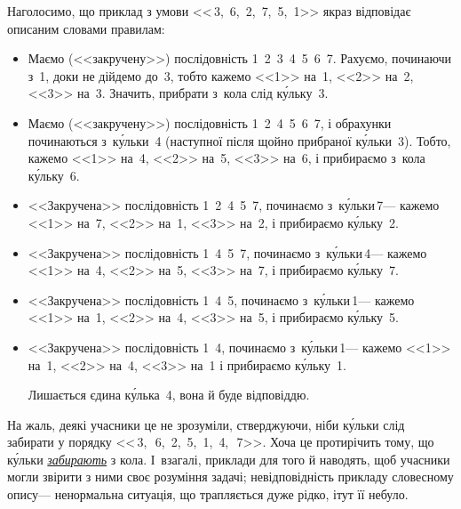 \Tutorial	
Наголосимо, що приклад з умови <<\textnumero$\,$3, \textnumero$\,$6, \textnumero$\,$2, \textnumero$\,$7, \textnumero$\,$5, \textnumero$\,$1>> якраз відповідає описаним словами правилам:
\begin{itemize}
\item
Маємо (<<закручену>>) послідовність 1~2~3~4~5~6~7. Рахуємо, починаючи з \textnumero$\,$1, доки не дійдемо до~3, тобто кажемо 
<<1>> на \textnumero$\,$1, 
<<2>> на \textnumero$\,$2, 
<<3>> на \textnumero$\,$3. Значить, прибрати з~кола слід к\'{у}льку \textnumero$\,$3.
\item
Маємо (<<закручену>>) послідовність 1~2~4~5~6~7, і обрахунки починаються з~к\'{у}льки \textnumero$\,$4 (наступної після щойно прибраної к\'{у}льки \textnumero$\,$3).
Тобто, кажемо 
<<1>> на \textnumero$\,$4, 
<<2>> на \textnumero$\,$5, 
<<3>> на \textnumero$\,$6, і прибираємо з~кола к\'{у}льку \textnumero$\,$6.
\item
<<Закручена>> послідовність 1~2~4~5~7, починаємо з~к\'{у}льки\nolinebreak[3] \textnumero$\,$7\nolinebreak[3] --- кажемо 
<<1>> на \textnumero$\,$7, 
<<2>> на \textnumero$\,$1, 
<<3>> на \textnumero$\,$2, і прибираємо к\'{у}льку \textnumero$\,$2.
\item
<<Закручена>> послідовність 1~4~5~7, починаємо з~к\'{у}льки\nolinebreak[3] \textnumero$\,$4\nolinebreak[3] --- кажемо 
<<1>> на \textnumero$\,$4, 
<<2>> на \textnumero$\,$5, 
<<3>> на \textnumero$\,$7, і прибираємо к\'{у}льку \textnumero$\,$7.
\item
<<Закручена>> послідовність 1~4~5, починаємо з~к\'{у}льки\nolinebreak[3] \textnumero$\,$1\nolinebreak[3] --- кажемо 
<<1>> на \textnumero$\,$1, 
<<2>> на \textnumero$\,$4, 
<<3>> на \textnumero$\,$5, і прибираємо к\'{у}льку \textnumero$\,$5.
\item
<<Закручена>> послідовність 1~4, починаємо з~к\'{у}льки\nolinebreak[3] \textnumero$\,$1\nolinebreak[3] --- кажемо 
<<1>> на \textnumero$\,$1, 
<<2>> на \textnumero$\,$4, 
<<3>> на \textnumero$\,$1 і прибираємо к\'{у}льку \textnumero$\,$1.

Лишається єдина к\'{у}лька \textnumero$\,$4, вона й буде відповіддю.
\end{itemize}
На жаль, деякі учасники це не зрозуміли, стверджуючи, ніби к\'{у}льки слід забирати у порядку <<\textnumero$\,$3,~\textnumero$\,$6, \textnumero$\,$2, \textnumero$\,$5, \textnumero$\,$1, \textnumero$\,$4,~\textnumero$\,$7>>. Хоча це протирічить тому, що к\'{у}льки \underline{\emph{забирають}} з кола. І~взагалі, приклади для того й наводять, щоб учасники могли звірити з ними своє розуміння задачі; невідповідність прикладу словесному опису\nolinebreak[3] --- ненормальна ситуація, що трапляється дуже рідко, і\nolinebreak[3] тут її не\nolinebreak[3] було.

